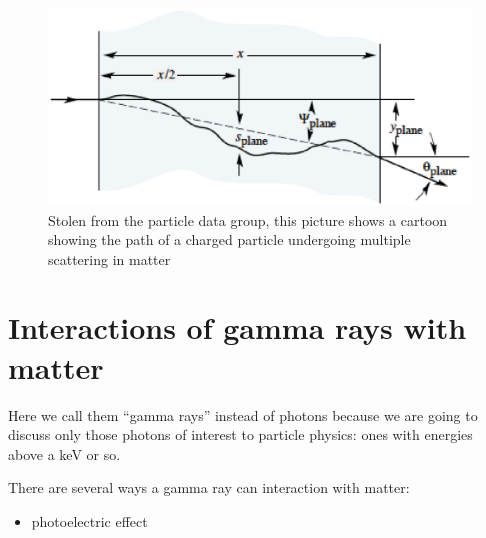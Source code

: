 \begin{figure}[h]
\centering\includegraphics[scale=0.5]{./particleinteractions/Pictures/multscattcartoon.eps}
\caption{Stolen from the particle data group, this picture shows a cartoon showing the path of a charged particle undergoing multiple scattering in matter }
\label{fig:pdgmultscattcartoon}
\end{figure}



\section{Interactions of gamma rays with matter}

Here we call them “gamma rays” instead of photons because we are going to discuss only those photons of interest to particle physics: ones with energies above a keV or so.

There are several ways a gamma ray can interaction with matter:
\begin{itemize}
\item photoelectric effect
\end{itemize}


